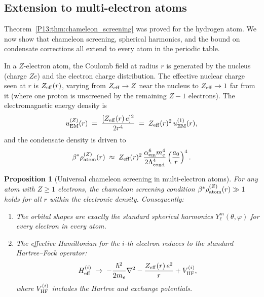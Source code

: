 \documentclass[11pt,a4paper]{article}
\newtheorem{proposition}[theorem]{Proposition}
\theoremstyle{definition}
\theoremstyle{remark}
\newcommand{\bst}{\beta^{*}}
\newcommand{\Lcond}{\Lambda_{\mathrm{cond}}}
\newcommand{\aem}{\alpha_{\mathrm{em}}}
\newcommand{\Heff}{H_{\mathrm{eff}}}
\begin{document}
\subsection{Extension to multi-electron atoms}
\label{P13:sec:multi_electron}

Theorem~\ref{P13:thm:chameleon_screening} was proved for the hydrogen atom.
We now show that chameleon screening, spherical harmonics, and the bound
on condensate corrections all extend to every atom in the periodic table.

In a $Z$-electron atom, the Coulomb field at radius $r$ is generated by
the nucleus (charge $Ze$) and the electron charge distribution.
The effective nuclear charge seen at $r$ is $Z_{\rm eff}(r)$, varying
from $Z_{\rm eff}\to Z$ near the nucleus to $Z_{\rm eff}\to 1$ far from it
(where one proton is unscreened by the remaining $Z-1$ electrons).
The electromagnetic energy density is
\begin{equation}
  u_{\rm EM}^{(Z)}(r)
  \;=\; \frac{[Z_{\rm eff}(r)\,e]^2}{2r^4}
  \;=\; Z_{\rm eff}(r)^2\,u_{\rm EM}^{(1)}(r),
  \label{P13:eq:uEM_Z}
\end{equation}
and the condensate density is driven to
\begin{equation}
  \bst\rho_{\rm atom}^{(Z)}(r)
  \;\approx\; Z_{\rm eff}(r)^2\,
  \frac{\aem^6 m_e^4}{2\Lcond^4}\left(\frac{a_0}{r}\right)^4.
  \label{P13:eq:rho_Z}
\end{equation}

\begin{proposition}[Universal chameleon screening in multi-electron atoms]
\label{P13:prop:multi_electron_screening}
For any atom with $Z\ge1$ electrons, the chameleon screening condition
$\bst\rho_{\rm atom}^{(Z)}(r)\gg1$ holds for all $r$ within the
electronic density.
Consequently:
\begin{enumerate}[noitemsep,label=(\roman*)]
\item The orbital shapes are exactly the standard spherical harmonics
  $Y_\ell^m(\theta,\varphi)$ for every electron in every atom.
\item The effective Hamiltonian for the $i$-th electron reduces to
  the standard Hartree--Fock operator:
  \begin{equation}
    \Heff^{(i)} \;\to\; -\frac{\hbar^2}{2m_e}\nabla^2
    - \frac{Z_{\rm eff}(r)\,e^2}{r}
    + V_{\rm HF}^{(i)},
    \label{P13:eq:H_HF_limit}
  \end{equation}
  where $V_{\rm HF}^{(i)}$ includes the Hartree and exchange potentials.
\end{enumerate}
\end{proposition}
\end{document}
